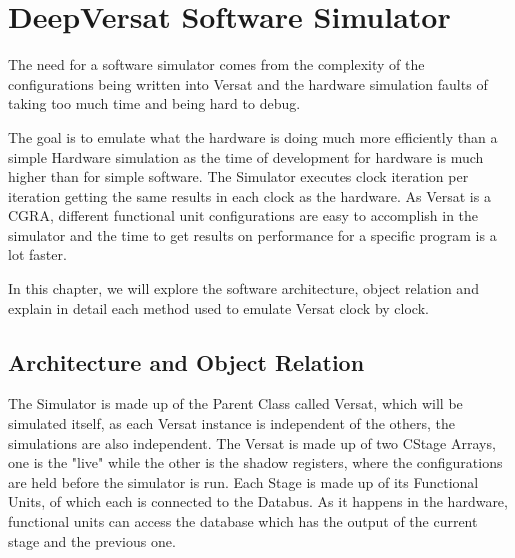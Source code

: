 \chapter{DeepVersat Software Simulator}
\label{chapter:Simulator}

The need for a software simulator comes from the complexity of the configurations 
being written into Versat and the hardware simulation faults of taking too much time and being hard to debug.

The goal is to emulate what the hardware is doing much more efficiently than 
a simple Hardware simulation as the time of development for hardware
is much higher than for simple software. The Simulator executes clock iteration per iteration 
getting the same results in each clock as the hardware. 
As Versat is a CGRA, different functional unit configurations are easy to accomplish 
in the simulator and the time to get results on performance
for a specific program is a lot faster. 

In this chapter, we will explore the software architecture, 
object relation and explain in detail each method used to emulate Versat clock by clock.




\section{Architecture and Object Relation}

The Simulator is made up of the Parent Class called Versat, which will be simulated itself, 
as each Versat instance is independent of the others, the simulations are also independent.
The Versat is made up of two CStage Arrays, one is the "live" while the other is the 
shadow registers, where the configurations are held before the simulator is run.
Each Stage is made up of its Functional Units, of which each is connected to the Databus.
As it happens in the hardware, functional units can access the database which has the output 
of the current stage and the previous one.
\clearpage

